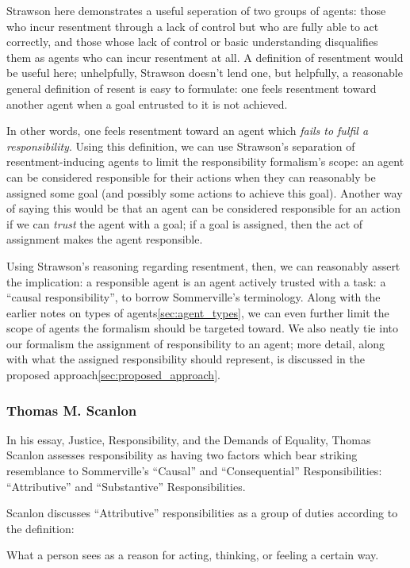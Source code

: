 Strawson here demonstrates a useful seperation of two groups of agents: those who incur resentment through a lack of control but who are fully able to act correctly, and those whose lack of control or basic understanding disqualifies them as agents who can incur resentment at all. A definition of resentment would be useful here; unhelpfully, Strawson doesn't lend one, but helpfully, a reasonable general definition of resent is easy to formulate: one feels resentment toward another agent when a goal entrusted to it is not achieved.\par

In other words, one feels resentment toward an agent which \emph{fails to fulfil a responsibility}. Using this definition, we can use Strawson's separation of resentment-inducing agents to limit the responsibility formalism's scope: an agent can be considered responsible for their actions when they can reasonably be assigned some goal (and possibly some actions to achieve this goal). Another way of saying this would be that an agent can be considered responsible for an action if we can \emph{trust} the agent with a goal; if a goal is assigned, then the act of assignment makes the agent responsible.\par

Using Strawson's reasoning regarding resentment, then, we can reasonably assert the implication: a responsible agent is an agent actively trusted with a task: a ``causal responsibility'', to borrow Sommerville's terminology. Along with the earlier notes on types of agents\cref{sec:agent_types}, we can even further limit the scope of agents the formalism should be targeted toward. We also neatly tie into our formalism the assignment of responsibility to an agent; more detail, along with what the assigned responsibility should represent, is discussed in the proposed approach\cref{sec:proposed_approach}.\par

\subsubsection{Thomas M. Scanlon}
In his essay, Justice, Responsibility, and the Demands of Equality\cite{scanlon2006justice}, Thomas Scanlon assesses responsibility as having two factors which bear striking resemblance to Sommerville's ``Causal'' and ``Consequential'' Responsibilities: ``Attributive'' and ``Substantive'' Responsibilities.\par

Scanlon discusses ``Attributive'' responsibilities as a group of duties according to the definition:
\begin{displayquote}
    What a person sees as a reason for acting, thinking, or feeling a certain way.
\end{displayquote}\par

